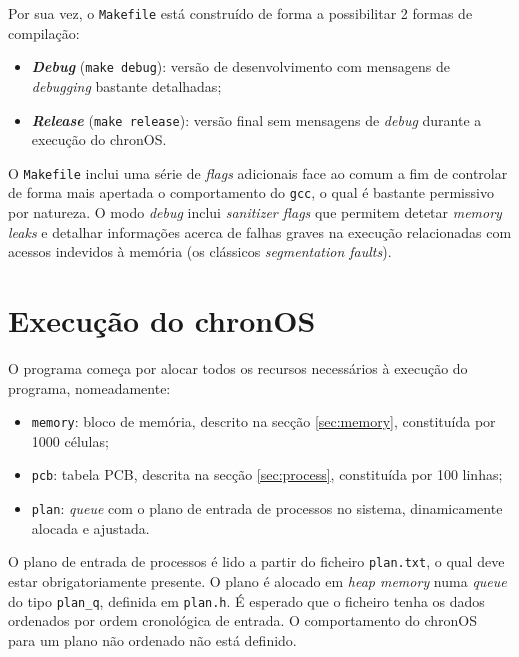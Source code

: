 \documentclass[a4paper,11pt,onecolumn,oneside]{article}
\newcommand{\chronOS}{\textsf{chronOS}}
\begin{document}
	Por sua vez, o \texttt{Makefile} está construído de forma a possibilitar 2 formas de compilação:
	
	\begin{itemize}
		\item \textbf{\textit{Debug}} (\verb|make debug|): versão de desenvolvimento com mensagens de \textit{debugging} bastante detalhadas;
		
		\item \textbf{\textit{Release}} (\verb|make release|): versão final sem mensagens de \textit{debug} durante a execução do \chronOS.
	\end{itemize}

	O \texttt{Makefile} inclui uma série de \textit{flags} adicionais face ao comum a fim de controlar de forma mais apertada o comportamento do \texttt{gcc}, o qual é bastante permissivo por natureza. O modo \textit{debug} inclui \textit{sanitizer flags} que permitem detetar \textit{memory leaks} e detalhar informações acerca de falhas graves na execução relacionadas com acessos indevidos à memória (os clássicos \textit{segmentation faults}).
	
	
	\section{Execução do \chronOS}
	\label{sec:main}
	
	O programa começa por alocar todos os recursos necessários à execução do programa, nomeadamente:
	
	\begin{itemize}
		\item \verb|memory|: bloco de memória, descrito na secção \ref{sec:memory}, constituída por 1000 células;
		\item \verb|pcb|: tabela PCB, descrita na secção \ref{sec:process}, constituída por 100 linhas;
		\item \verb|plan|: \textit{queue} com o plano de entrada de processos no sistema, dinamicamente alocada e ajustada.
	\end{itemize}

	O plano de entrada de processos é lido a partir do ficheiro \texttt{plan.txt}, o qual deve estar obrigatoriamente presente. O plano é alocado em \textit{heap memory} numa \textit{queue} do tipo \verb|plan_q|, definida em \verb|plan.h|. É esperado que o ficheiro tenha os dados ordenados por ordem cronológica de entrada. O comportamento do \chronOS~ para um plano não ordenado não está definido.
	
\end{document}
